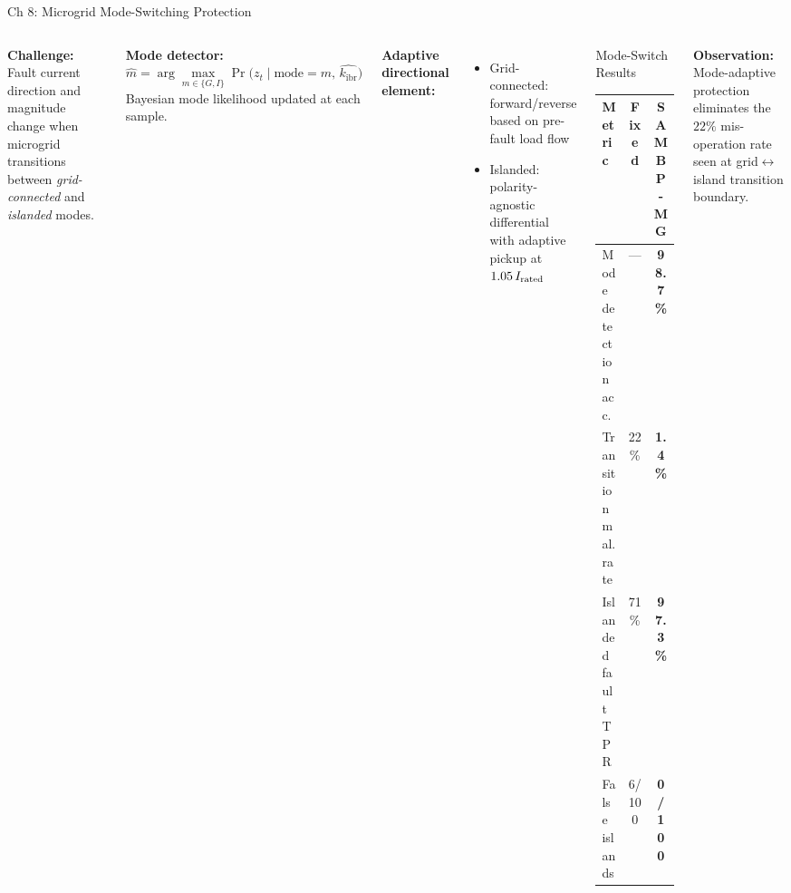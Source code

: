 \documentclass[10pt,aspectratio=169]{beamer}
\newcommand{\obs}[1]{%
  {\color{iitmred}\textbf{Observation:} #1}%
}
\newcommand{\kibr}{k_{\mathrm{ibr}}}
\begin{document}
\begin{frame}{Ch 8: Microgrid Mode-Switching Protection}
  \begin{columns}[T]
      \textbf{Challenge:} Fault current direction and magnitude
      change when microgrid transitions between
      \textit{grid-connected} and \textit{islanded} modes.

      \medskip
      \textbf{Mode detector:}
      \[
        \hat{m} = \arg\max_{m \in \{G,I\}}
          \Pr\bigl(z_t \mid \text{mode}=m,\, \hat{\kibr}\bigr)
      \]
      Bayesian mode likelihood updated at each sample.

      \medskip
      \textbf{Adaptive directional element:}
      \begin{itemize}\itemsep3pt
        \item Grid-connected: forward/reverse based on
          pre-fault load flow
        \item Islanded: polarity-agnostic differential
          with adaptive pickup at $1.05\,I_{\rm rated}$
      \end{itemize}
      \begin{block}{\small Mode-Switch Results}
        \small
        \begin{tabular}{lcc}
          \toprule
          Metric & Fixed & SAMBP-MG\\
          \midrule
          Mode detection acc. & — & \textbf{98.7\%}\\
          Transition mal. rate & 22\% & \textbf{1.4\%}\\
          Islanded fault TPR & 71\% & \textbf{97.3\%}\\
          False islands & 6/100 & \textbf{0/100}\\
          \bottomrule
        \end{tabular}
      \end{block}
      \vspace{0.2cm}
      \obs{Mode-adaptive protection eliminates the
        $22\%$ mis-operation rate seen at
        grid$\leftrightarrow$island transition boundary.}
  \end{columns}
\end{frame}
\end{document}
